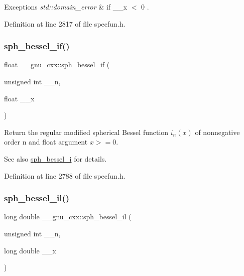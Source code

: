 \begin{DoxyExceptions}{Exceptions}
{\em std\+::domain\+\_\+error} & if {\ttfamily  \+\_\+\+\_\+x $<$ 0 }. \\
\hline
\end{DoxyExceptions}


Definition at line 2817 of file specfun.\+h.

\mbox{\label{group__mathsf__gnu_gacc6738f18c1ba19452b9dd814d11c00c}} 
\subsubsection{\texorpdfstring{sph\+\_\+bessel\+\_\+if()}{sph\_bessel\_if()}}
{\footnotesize\ttfamily float \+\_\+\+\_\+gnu\+\_\+cxx\+::sph\+\_\+bessel\+\_\+if (\begin{DoxyParamCaption}\item[{unsigned int}]{\+\_\+\+\_\+n,  }\item[{float}]{\+\_\+\+\_\+x }\end{DoxyParamCaption})\hspace{0.3cm}{\ttfamily [inline]}}

Return the regular modified spherical Bessel function $ i_n(x) $ of nonnegative order n and {\ttfamily float} argument $ x >= 0 $.

\begin{DoxySeeAlso}{See also}
\hyperlink{group__mathsf__gnu_ga156b8154b27b7898c8b2abf4284f7323}{sph\+\_\+bessel\+\_\+i} for details. 
\end{DoxySeeAlso}


Definition at line 2788 of file specfun.\+h.

\mbox{\label{group__mathsf__gnu_gaf4392d9ed177913febdcbfccb947dbca}} 
\subsubsection{\texorpdfstring{sph\+\_\+bessel\+\_\+il()}{sph\_bessel\_il()}}
{\footnotesize\ttfamily long double \+\_\+\+\_\+gnu\+\_\+cxx\+::sph\+\_\+bessel\+\_\+il (\begin{DoxyParamCaption}\item[{unsigned int}]{\+\_\+\+\_\+n,  }\item[{long double}]{\+\_\+\+\_\+x }\end{DoxyParamCaption})\hspace{0.3cm}{\ttfamily [inline]}}

